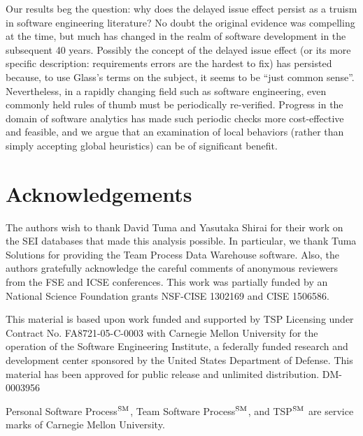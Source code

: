\documentclass[smallcondensed]{svjour3}
\begin{document}
Our results beg the question: why does the delayed issue effect persist as a truism in software engineering literature? No doubt the original evidence was compelling at the time, but much has changed in the realm of software development in the subsequent 40 years. Possibly the concept of the delayed issue effect (or its more specific description: requirements errors are the hardest to fix)
has persisted because, to use Glass's terms on the subject, it seems to be ``just common sense''\cite{glass02}. 
Nevertheless, in a rapidly changing field such as software engineering, even commonly held rules of thumb must be periodically re-verified. 
Progress in the domain of software analytics has made such periodic checks more cost-effective and feasible, and we argue that an examination of local behaviors (rather than simply accepting global heuristics) can be of significant benefit.

  
 


\section*{Acknowledgements}
The authors wish to thank  David Tuma and  Yasutaka Shirai for their work on the SEI databases
that made this analysis possible.
In particular, we thank Tuma Solutions for providing the Team Process Data Warehouse software.
Also, the authors gratefully acknowledge the careful comments of anonymous reviewers from the
FSE and ICSE conferences.
This work was partially funded by an National Science
Foundation grants NSF-CISE 1302169 and CISE 1506586.

This material is based upon work funded and supported by TSP Licensing under Contract No. FA8721-05-C-0003 with Carnegie Mellon University for the operation of the Software Engineering Institute, a federally funded research and development center sponsored by the United States Department of Defense.  This material has been approved for public release and unlimited distribution.  DM-0003956

Personal Software Process$\textsuperscript{SM}$, Team Software Process$\textsuperscript{SM}$, and TSP$\textsuperscript{SM}$ are service marks of Carnegie Mellon University.

 
\vspace*{0.5mm} 
\balance

 
\end{document}
